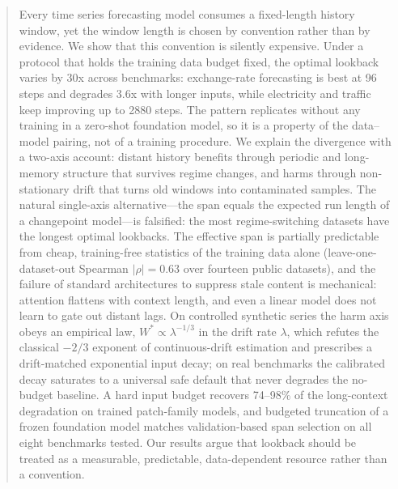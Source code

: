 \begin{abstract}
Every time series forecasting model consumes a fixed-length history window, yet the window length is chosen by convention rather than by evidence. We show that this convention is silently expensive. Under a protocol that holds the training data budget fixed, the optimal lookback varies by 30x across benchmarks: exchange-rate forecasting is best at 96 steps and degrades 3.6x with longer inputs, while electricity and traffic keep improving up to 2880 steps. The pattern replicates without any training in a zero-shot foundation model, so it is a property of the data--model pairing, not of a training procedure. We explain the divergence with a two-axis account: distant history benefits through periodic and long-memory structure that survives regime changes, and harms through non-stationary drift that turns old windows into contaminated samples. The natural single-axis alternative---the span equals the expected run length of a changepoint model---is falsified: the most regime-switching datasets have the longest optimal lookbacks. The effective span is partially predictable from cheap, training-free statistics of the training data alone (leave-one-dataset-out Spearman $|\rho| = 0.63$ over fourteen public datasets), and the failure of standard architectures to suppress stale content is mechanical: attention flattens with context length, and even a linear model does not learn to gate out distant lags. On controlled synthetic series the harm axis obeys an empirical law, $W^* \propto \lambda^{-1/3}$ in the drift rate $\lambda$, which refutes the classical $-2/3$ exponent of continuous-drift estimation and prescribes a drift-matched exponential input decay; on real benchmarks the calibrated decay saturates to a universal safe default that never degrades the no-budget baseline. A hard input budget recovers 74--98\% of the long-context degradation on trained patch-family models, and budgeted truncation of a frozen foundation model matches validation-based span selection on all eight benchmarks tested. Our results argue that lookback should be treated as a measurable, predictable, data-dependent resource rather than a convention.
\end{abstract}

